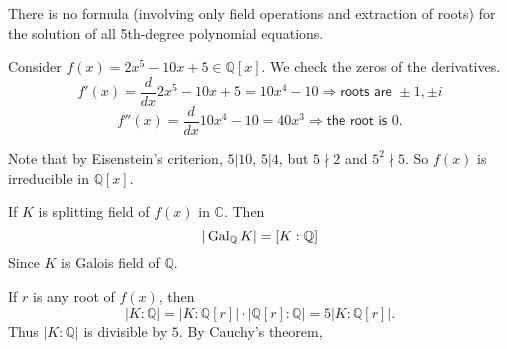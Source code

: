 \begin{example}
    There is no formula (involving only field operations and extraction of roots) for the 
    solution of all 5th-degree polynomial equations.
\end{example}
\begin{solution}
    Consider $f(x) = 2x^5 - 10x + 5 \in \mathbb{Q}[x]$. We check the zeros of the derivatives.
    \[
        f'(x) = \frac{d}{dx} 2x^5 - 10x + 5 = 10x^4 - 10 \Longrightarrow \textsf{roots are } \pm 1, \pm i
    \]
    \[
        f''(x) = \frac{d}{dx} 10x^4 - 10 = 40x^3 \Longrightarrow \textsf{the root is } 0.
    \]

    Note that by Eisenstein's criterion, $5|10$, $5|4$, but $5 \nmid 2$ and $5^2 \nmid 5$. So $f(x)$ 
    is irreducible in $\mathbb{Q}[x]$. 

    If $K$ is splitting field of $f(x)$ in $\mathbb{C}$. Then 
    \[
    |\operatorname{Gal}_\mathbb{Q} K| = [K:\mathbb{Q}]
    \]
    Since $K$ is Galois field of $\mathbb{Q}$.

    If $r$ is any root of $f(x)$, then 
    \[
        |K:\mathbb{Q}| = |K: \mathbb{Q}[r]| \cdot |\mathbb{Q}[r] : \mathbb{Q}| = 5 |K: \mathbb{Q}[r]|.
    \]
    Thus $|K : \mathbb{Q}|$ is divisible by $5$. By Cauchy's theorem, 

\end{solution}